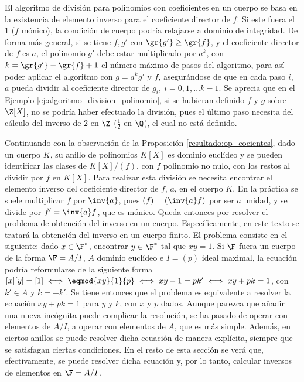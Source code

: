 \begin{obss} \label{resultado:inv_cuerpos}
    \item El algoritmo de división para polinomios con coeficientes en un cuerpo se basa en la existencia de elemento inverso para el coeficiente director de $f$. Si este fuera el $1$ ($f$ mónico), la condición de cuerpo podría relajarse a dominio de integridad. De forma más general, si se tiene $f,g'$ con $\gr{g'} \geq \gr{f}$, y el coeficiente director de $f$ es $a$, el polinomio $g'$ debe estar multiplicado por $a^k$, con $k = \gr{g'} -\gr{f} + 1$ el número máximo de pasos del algoritmo, para así poder aplicar el algoritmo con $g = a^kg'$ y $f$, asegurándose de que en cada paso $i$, $a$ pueda dividir al coeficiente director de $g_i, \ i = 0,1,\ldots k-1$. Se aprecia que en el Ejemplo \ref{ej:algoritmo_division_polinomio}, si se hubieran definido $f$ y $g$ sobre $\Z[X]$, no se podría haber efectuado la división, pues el último paso necesita del cálculo del inverso de 2 en $\Z$ ($\frac{1}{2}$ en $\Q$), el cual no está definido.
        
    \item Continuando con la observación de la Proposición \ref{resultado:op_cocientes}, dado un cuerpo $K$, su anillo de polinomios $K[X]$ es dominio euclídeo y se pueden identificar las clases de $K[X]/(f)$, con $f$ polinomio no nulo, con los restos al dividir por $f$ en $K[X]$. Para realizar esta división se necesita encontrar el elemento inverso del coeficiente director de $f$, $a$, en el cuerpo $K$. En la práctica se suele multiplicar $f$ por $\inv{a}$, pues $(f) = (\inv{a}f)$ por ser $a$ unidad, y se divide por $f' = \inv{a}f $, que es mónico. Queda entonces por resolver el problema de obtención del inverso en un cuerpo. Específicamente, en este texto se tratará la obtención del inverso en un cuerpo finito. El problema consiste en el siguiente: dado $x\in \F^*$, encontrar $y\in \F^*$ tal que $xy = 1$. Si $\F$ fuera un cuerpo de la forma $\F = A/I$, $A$ dominio euclídeo e $I = (p)$ ideal maximal, la ecuación podría reformularse de la siguiente forma $[x][y] = [1]\iff \eqmod{xy}{1}{p}\iff xy - 1 = pk' \iff xy + pk = 1$, con $k'\in A$ y $k = -k'$. Se tiene entonces que el problema es equivalente a resolver la ecuación $xy + pk = 1$ para $y$ y $k$, con $x$ y $p$ dados. Aunque parezca que añadir una nueva incógnita puede complicar la resolución, se ha pasado de operar con elementos de $A/I$, a operar con elementos de $A$, que es más simple. Además, en ciertos anillos se puede resolver dicha ecuación de manera explícita, siempre que se satisfagan ciertas condiciones. En el resto de esta sección se verá que, efectivamente, se puede resolver dicha ecuación y, por lo tanto, calcular inversos de elementos en $\F = A/I$.


\end{obss}
